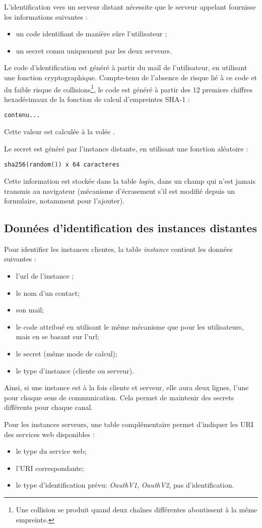 L'identification vers un serveur distant nécessite que le serveur appelant fournisse les informations suivantes :
\begin{itemize}
\item un code identifiant de manière sûre l'utilisateur ;
\item un secret connu uniquement par les deux serveurs.
\end{itemize}

Le code d'identification est généré à partir du mail de l'utilisateur, en utilisant une fonction cryptographique. Compte-tenu de l'absence de risque lié à ce code et du faible risque de collisions\footnote{Une collision se produit quand deux chaînes différentes aboutissent à la même empreinte.}, le code est généré à partir des 12 premiers chiffres hexadécimaux de la fonction de calcul d'empreintes SHA-1 :

\begin{lstlisting}
contenu...
\end{lstlisting}

Cette valeur est calculée \og à la volée \fg{}.

Le secret est généré par l'instance distante, en utilisant une fonction aléatoire :
\begin{lstlisting}
sha256(random()) x 64 caracteres
\end{lstlisting}

Cette information est stockée dans la table \textit{login}, dans un champ qui n'est jamais transmis au navigateur (mécanisme d'écrasement s'il est modifié depuis un formulaire, notamment pour l'ajouter).

\subsection{Données d'identification des instances distantes}

Pour identifier les instances clientes, la table \textit{instance} contient les données suivantes :
\begin{itemize}
\item l'url de l'instance ;
\item le nom d'un contact;
\item son mail;
\item le code attribué en utilisant le même mécanisme que pour les utilisateurs, mais en se basant sur l'url;
\item le secret (même mode de calcul);
\item le type d'instance (cliente ou serveur).
\end{itemize}
Ainsi, si une instance est à la fois cliente et serveur, elle aura deux lignes, l'une pour chaque sens de communication. Cela permet de maintenir des secrets différents pour chaque canal.

Pour les instances \og serveurs\fg{}, une table complémentaire permet d'indiquer les URI des services web disponibles :
\begin{itemize}
\item le type du service web;
\item l'URI correspondante;
\item le type d'identification prévu: \textit{OauthV1}, \textit{OauthV2}, pas d'identification.
\end{itemize}